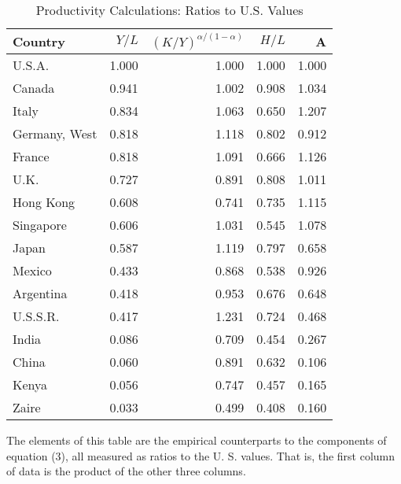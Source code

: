 \begin{table}[H]
\caption*{
{\large Productivity Calculations: Ratios to U.S. Values}
} 

\fontsize{12.0pt}{14.4pt}\selectfont

\begin{tabular*}{\linewidth}{@{\extracolsep{\fill}}lrrrr}
\toprule
Country & $Y/L$ & $(K/Y)^{\alpha/(1-\alpha)}$ & $H/L$ & A \\ 
\midrule\addlinespace[2.5pt]
U.S.A. & 1.000 & 1.000 & 1.000 & 1.000 \\
Canada & 0.941 & 1.002 & 0.908 & 1.034 \\
Italy & 0.834 & 1.063 & 0.650 & 1.207 \\
Germany, West & 0.818 & 1.118 & 0.802 & 0.912 \\
France & 0.818 & 1.091 & 0.666 & 1.126 \\
U.K. & 0.727 & 0.891 & 0.808 & 1.011 \\
Hong Kong & 0.608 & 0.741 & 0.735 & 1.115 \\
Singapore & 0.606 & 1.031 & 0.545 & 1.078 \\
Japan & 0.587 & 1.119 & 0.797 & 0.658 \\
Mexico & 0.433 & 0.868 & 0.538 & 0.926 \\
Argentina & 0.418 & 0.953 & 0.676 & 0.648 \\
U.S.S.R. & 0.417 & 1.231 & 0.724 & 0.468 \\
India & 0.086 & 0.709 & 0.454 & 0.267 \\
China & 0.060 & 0.891 & 0.632 & 0.106 \\
Kenya & 0.056 & 0.747 & 0.457 & 0.165 \\
Zaire & 0.033 & 0.499 & 0.408 & 0.160 \\
\bottomrule
\end{tabular*}
\begin{minipage}{\linewidth}
The elements of this table are the empirical counterparts to the components of equation (3), all measured as ratios to the U. S. values. That is, the first column of data is the product of the other three columns.\\
\end{minipage}
\end{table}
